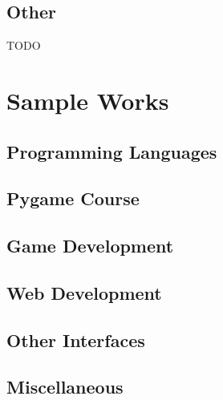 \documentclass[letterpaper,twoside]{portfolio}
\begin{document}
\chapter{Other}
TODO

\part{Sample Works}

\chapter{Programming Languages}







\chapter{Pygame Course}


\chapter{Game Development}

\chapter{Web Development}




\chapter{Other Interfaces}




\chapter{Miscellaneous}



\end{document}
